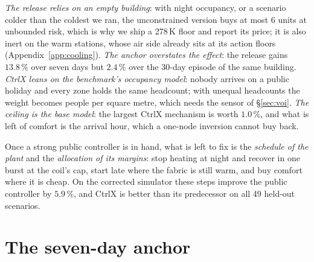 \documentclass{article}
\begin{document}
\emph{The release relies on an empty building}: with night occupancy, or a scenario colder
than the coldest we ran, the unconstrained version buys at most 6 units at unbounded risk, which
is why we ship a 278\,K floor and report its price; it is also inert on the warm stations, whose
air side already sits at its action floors (Appendix~\ref{app:cooling}). \emph{The anchor
overstates the effect}: the release gains $13.8\,\%$ over seven days but $2.4\,\%$ over the
30-day episode of the same building. \emph{CtrlX leans on the benchmark's occupancy model}:
nobody arrives on a public holiday and every zone holds the same headcount; with unequal
headcounts the weight becomes people per square metre, which needs the sensor of
\S\ref{sec:voi}. \emph{The ceiling is the base model}: the largest CtrlX mechanism is worth
$1.0\,\%$, and what is left of comfort is the arrival hour, which a one-node inversion cannot
buy back.

Once a strong public controller is in hand, what is left to fix is the \emph{schedule of the
plant} and the \emph{allocation of its margins}: stop heating at night and recover in one burst
at the coil's cap, start late where the fabric is still warm, and buy comfort where it is cheap.
On the corrected simulator these steps improve the public controller by $5.9\,\%$, and CtrlX is
better than its predecessor on all 49 held-out scenarios.




\appendix

\section{The seven-day anchor}
\label{app:anchor}
\end{document}
